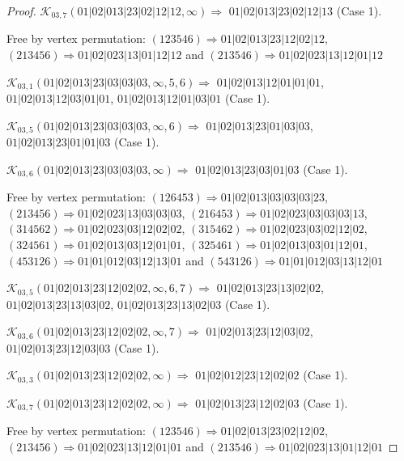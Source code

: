 \documentclass[12pt]{article}
\theoremstyle{plain}
\theoremstyle{definition}
\theoremstyle{remark}
\newcommand{\fancy}[1]{\mathcal{#1}}
\def\K{\fancy{K}}
\begin{document}
\begin{proof}
	$\K_{03,7}(01|02|013|23|02|12|12,\infty)\Rightarrow $ $01|02|013|23|02|12|13$ (Case 1).
	
	
	
	Free by vertex permutation: $(1 2 3 5 4 6)\Rightarrow 01|02|013|23|12|02|12$, $(2 1 3 4 5 6)\Rightarrow 01|02|023|13|01|12|12$ and $(2 1 3 5 4 6)\Rightarrow 01|02|023|13|12|01|12$
	
	
	
	\bigskip
	
	$\K_{03,1}(01|02|013|23|03|03|03,\infty,5, 6)\Rightarrow $ $01|02|013|12|01|01|01$, $01|02|013|12|03|01|01$, $01|02|013|12|01|03|01$ (Case 1).
	
	$\K_{03,5}(01|02|013|23|03|03|03,\infty,6)\Rightarrow $ $01|02|013|23|01|03|03$, $01|02|013|23|01|01|03$ (Case 1).
	
	$\K_{03,6}(01|02|013|23|03|03|03,\infty)\Rightarrow $ $01|02|013|23|03|01|03$ (Case 1).
	
	
	
	Free by vertex permutation: $(1 2 6 4 5 3)\Rightarrow 01|02|013|03|03|03|23$, $(2 1 3 4 5 6)\Rightarrow 01|02|023|13|03|03|03$, $(2 1 6 4 5 3)\Rightarrow 01|02|023|03|03|03|13$, $(3 1 4 5 6 2)\Rightarrow 01|02|023|03|12|02|02$, $(3 1 5 4 6 2)\Rightarrow 01|02|023|03|02|12|02$, $(3 2 4 5 6 1)\Rightarrow 01|02|013|03|12|01|01$, $(3 2 5 4 6 1)\Rightarrow 01|02|013|03|01|12|01$, $(4 5 3 1 2 6)\Rightarrow 01|01|012|03|12|13|01$ and $(5 4 3 1 2 6)\Rightarrow 01|01|012|03|13|12|01$
	
	
	
	\bigskip
	
	$\K_{03,5}(01|02|013|23|12|02|02,\infty,6, 7)\Rightarrow $ $01|02|013|23|13|02|02$, $01|02|013|23|13|03|02$, $01|02|013|23|13|02|03$ (Case 1).
	
	$\K_{03,6}(01|02|013|23|12|02|02,\infty,7)\Rightarrow $ $01|02|013|23|12|03|02$, $01|02|013|23|12|03|03$ (Case 1).
	
	$\K_{03,3}(01|02|013|23|12|02|02,\infty)\Rightarrow $ $01|02|012|23|12|02|02$ (Case 1).
	
	$\K_{03,7}(01|02|013|23|12|02|02,\infty)\Rightarrow $ $01|02|013|23|12|02|03$ (Case 1).
	
	
	
	Free by vertex permutation: $(1 2 3 5 4 6)\Rightarrow 01|02|013|23|02|12|02$, $(2 1 3 4 5 6)\Rightarrow 01|02|023|13|12|01|01$ and $(2 1 3 5 4 6)\Rightarrow 01|02|023|13|01|12|01$
	
	
	
	\bigskip
	

\end{proof}
\end{document}
